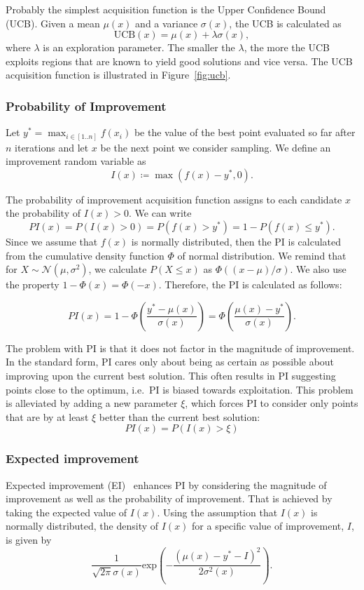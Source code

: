 Probably the simplest acquisition function is the Upper Confidence Bound (UCB). Given a mean $\mu(x)$ and a variance $\sigma(x)$, the UCB is calculated as
\[
    \text{UCB}(x) = \mu(x) + \lambda \sigma(x),
\]
where $\lambda$ is an exploration parameter. The smaller the $\lambda$, the more the UCB exploits regions that are known to yield good solutions and vice versa. The UCB acquisition function is illustrated in Figure~\ref{fig:ucb}.

\subsubsection{Probability of Improvement}
Let $y^*=\max_{i\in[1..n]} f(x_i)$ be the value of the best point evaluated so far after $n$ iterations and let $x$ be the next point we consider sampling. We define an improvement random variable as
\[
    I(x) \coloneq \max(f(x) - y^*,0).
\]

The probability of improvement acquisition function assigns to each candidate $x$ the probability of $I(x) > 0$. We can write
\[
    PI(x) = P(I(x) > 0) = P(f(x) > y^*) = 1-P(f(x) \leq y^*).
\]
Since we assume that $f(x)$ is normally distributed, then the PI is calculated from the cumulative density function $\Phi$ of normal distribution. We remind that for $X \sim \mathcal{N}(\mu,\sigma^2)$, we calculate $P(X \leq x)$ as $\Phi ((x-\mu)/\sigma )$. We also use the property $1-\Phi(x)=\Phi(-x)$. Therefore, the PI is calculated as follows:

\[
    PI(x) = 1 - \Phi\left(\frac{y^*-\mu(x)}{\sigma(x)}\right) = \Phi\left(\frac{\mu(x)-y^*}{\sigma(x)}\right).
\]

The problem with PI is that it does not factor in the magnitude of improvement. In the standard form, PI cares only about being as certain as possible about improving upon the current best solution. This often results in PI suggesting points close to the optimum, i.e.\ PI is biased towards exploitation. This problem is alleviated by adding a new parameter $\xi$, which forces PI to consider only points that are by at least $\xi$ better than the current best solution:
\[
    PI(x)=P(I(x)>\xi)
\]

\subsubsection{Expected improvement}
Expected improvement (EI)~\cite{jones1998efficient} enhances PI by considering the magnitude of improvement as well as the probability of improvement. That is achieved by taking the expected value of $I(x)$. Using the assumption that $I(x)$ is normally distributed, the density of $I(x)$ for a specific value of improvement, $I$, is given by
\[
\frac{1}{\sqrt{2 \pi}\sigma(x)} \text{exp}\left(-\frac{(\mu(x)-y^*-I)^2}{2\sigma^2(x)}\right).
\]


